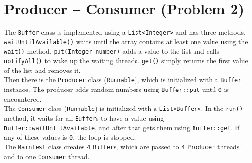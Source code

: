 \documentclass{article}
\begin{document}
  \section{Producer – Consumer (Problem 2)}

  The \texttt{Buffer} class is implemented using a \texttt{List<Integer>} and has three methods. \texttt{waitUntilAvailable()} waits until the array contains at least one value using the \texttt{wait()} method. \texttt{put(Integer number)} adds a value to the list and calls \texttt{notifyAll()} to wake up the waiting threads. \texttt{get()} simply returns the first value of the list and removes it.\\
  Then there is the \texttt{Producer} class (\texttt{Runnable}), which is initialized with a \texttt{Buffer} instance. The producer adds random numbers using \texttt{Buffer::put} until \texttt{0} is encountered.\\
  The \texttt{Consumer} class (\texttt{Runnable}) is initialized with a \texttt{List<Buffer>}. In the \texttt{run()} method, it waits for all \texttt{Buffer}s to have a value using \texttt{Buffer::waitUntilAvailable}, and after that gets them using \texttt{Buffer::get}. If any of these values is \texttt{0}, the loop is stopped.\\
  The \texttt{MainTest} class creates \texttt{4} \texttt{Buffer}s, which are passed to \texttt{4} \texttt{Producer} threads and to one \texttt{Consumer} thread.
\end{document}
